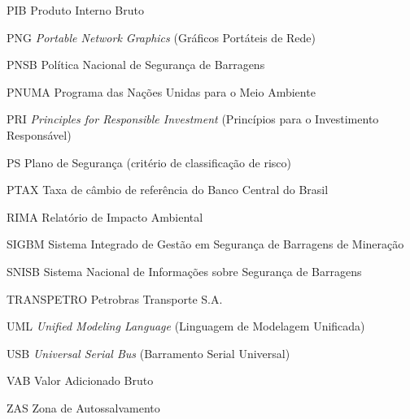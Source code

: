 \begin{siglas}
    \item[PIB] Produto Interno Bruto
    \item[PNG] \textit{Portable Network Graphics} (Gráficos Portáteis de Rede)
    \item[PNSB] Política Nacional de Segurança de Barragens
    \item[PNUMA] Programa das Nações Unidas para o Meio Ambiente
    \item[PRI] \textit{Principles for Responsible Investment} (Princípios para o Investimento Responsável)
    \item[PS] Plano de Segurança (critério de classificação de risco)
    \item[PTAX] Taxa de câmbio de referência do Banco Central do Brasil
    \item[RIMA] Relatório de Impacto Ambiental
    \item[SIGBM] Sistema Integrado de Gestão em Segurança de Barragens de Mineração
    \item[SNISB] Sistema Nacional de Informações sobre Segurança de Barragens
    \item[TRANSPETRO] Petrobras Transporte S.A.
    \item[UML] \textit{Unified Modeling Language} (Linguagem de Modelagem Unificada)
    \item[USB] \textit{Universal Serial Bus} (Barramento Serial Universal)
    \item[VAB] Valor Adicionado Bruto
    \item[ZAS] Zona de Autossalvamento
\end{siglas}
